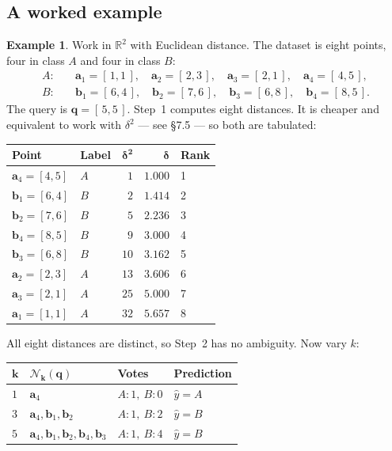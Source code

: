 \documentclass[11pt]{article}
\theoremstyle{plain}
\theoremstyle{definition}
\newtheorem{ex}{Example}[section]
\theoremstyle{remark}
\newcommand{\R}{\mathbb{R}}
\newcommand{\vc}[1]{\mathbf{#1}}
\newcommand{\Nk}{\mathcal{N}_k}
\begin{document}
\subsection{A worked example}
\begin{ex}
Work in $\R^{2}$ with Euclidean distance. The dataset is eight points, four in
class $A$ and four in class $B$:
\[
  \begin{aligned}
    A:\quad & \vc{a}_1=[\,1,1\,],\quad \vc{a}_2=[\,2,3\,],\quad
              \vc{a}_3=[\,2,1\,],\quad \vc{a}_4=[\,4,5\,], \\
    B:\quad & \vc{b}_1=[\,6,4\,],\quad \vc{b}_2=[\,7,6\,],\quad
              \vc{b}_3=[\,6,8\,],\quad \vc{b}_4=[\,8,5\,].
  \end{aligned}
\]
The query is $\vc{q}=[\,5,5\,]$. Step~1 computes eight distances. It is cheaper
and equivalent to work with $\delta^{2}$ --- see \S7.5 --- so both are tabulated:

\begin{center}
\renewcommand{\arraystretch}{1.25}
\begin{tabular}{@{}l l r r l@{}}
\toprule
\textbf{Point} & \textbf{Label} & $\boldsymbol{\delta^{2}}$ & $\boldsymbol{\delta}$
  & \textbf{Rank} \\
\midrule
$\vc{a}_4=[4,5]$ & $A$ & $1$  & $1.000$ & 1 \\
$\vc{b}_1=[6,4]$ & $B$ & $2$  & $1.414$ & 2 \\
$\vc{b}_2=[7,6]$ & $B$ & $5$  & $2.236$ & 3 \\
$\vc{b}_4=[8,5]$ & $B$ & $9$  & $3.000$ & 4 \\
$\vc{b}_3=[6,8]$ & $B$ & $10$ & $3.162$ & 5 \\
$\vc{a}_2=[2,3]$ & $A$ & $13$ & $3.606$ & 6 \\
$\vc{a}_3=[2,1]$ & $A$ & $25$ & $5.000$ & 7 \\
$\vc{a}_1=[1,1]$ & $A$ & $32$ & $5.657$ & 8 \\
\bottomrule
\end{tabular}
\end{center}

\noindent All eight distances are distinct, so Step~2 has no ambiguity. Now vary
$k$:

\begin{center}
\renewcommand{\arraystretch}{1.3}
\begin{tabular}{@{}l l l l@{}}
\toprule
$\boldsymbol{k}$ & $\boldsymbol{\Nk(\vc{q})}$ & \textbf{Votes}
  & \textbf{Prediction} \\
\midrule
$1$ & $\vc{a}_4$
    & $A:1,\ B:0$ & $\hat{y}=A$ \\
$3$ & $\vc{a}_4,\vc{b}_1,\vc{b}_2$
    & $A:1,\ B:2$ & $\hat{y}=B$ \\
$5$ & $\vc{a}_4,\vc{b}_1,\vc{b}_2,\vc{b}_4,\vc{b}_3$
    & $A:1,\ B:4$ & $\hat{y}=B$ \\
\bottomrule
\end{tabular}
\end{center}


\end{ex}
\end{document}
